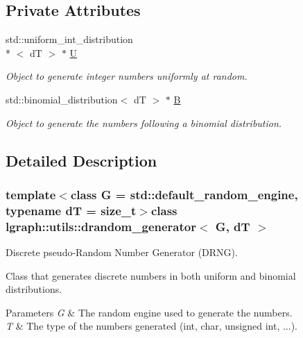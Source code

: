 \subsection*{Private Attributes}
\begin{DoxyCompactItemize}
\item 
\hypertarget{classlgraph_1_1utils_1_1drandom__generator_a995de3b90cefebba7aa0d93a7900bebb}{std\-::uniform\-\_\-int\-\_\-distribution\\*
$<$ d\-T $>$ $\ast$ \hyperlink{classlgraph_1_1utils_1_1drandom__generator_a995de3b90cefebba7aa0d93a7900bebb}{U}}\label{classlgraph_1_1utils_1_1drandom__generator_a995de3b90cefebba7aa0d93a7900bebb}

\begin{DoxyCompactList}\small\item\em Object to generate integer numbers uniformly at random. \end{DoxyCompactList}\item 
\hypertarget{classlgraph_1_1utils_1_1drandom__generator_abf2a3acb2bdee25e7fef80d465d69c97}{std\-::binomial\-\_\-distribution$<$ d\-T $>$ $\ast$ \hyperlink{classlgraph_1_1utils_1_1drandom__generator_abf2a3acb2bdee25e7fef80d465d69c97}{B}}\label{classlgraph_1_1utils_1_1drandom__generator_abf2a3acb2bdee25e7fef80d465d69c97}

\begin{DoxyCompactList}\small\item\em Object to generate the numbers following a binomial distribution. \end{DoxyCompactList}\end{DoxyCompactItemize}


\subsection{Detailed Description}
\subsubsection*{template$<$class G = std\-::default\-\_\-random\-\_\-engine, typename d\-T = size\-\_\-t$>$class lgraph\-::utils\-::drandom\-\_\-generator$<$ G, d\-T $>$}

Discrete pseudo-\/\-Random Number Generator (D\-R\-N\-G). 

Class that generates discrete numbers in both uniform and binomial distributions.


\begin{DoxyParams}{Parameters}
{\em G} & The random engine used to generate the numbers. \\
\hline
{\em T} & The type of the numbers generated (int, char, unsigned int, ...). \\
\hline
\end{DoxyParams}


